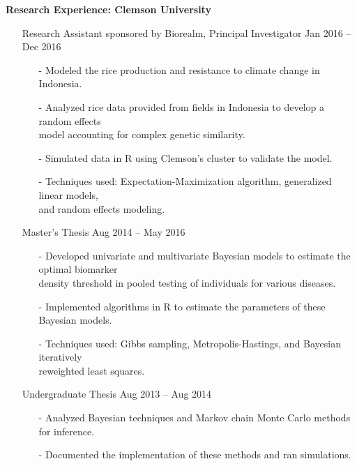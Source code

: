 \documentclass[10pt]{article}
\begin{document}
\noindent
\textbf{Research Experience: Clemson University}
\vspace{-0.25cm}
\begin{itemize}
\item[] Research Assistant sponsored by Biorealm, Principal Investigator \hfill Jan 2016 -- Dec 2016
\vspace{-0.25cm}
\begin{itemize}
\item[-] Modeled the rice production and resistance to climate change in Indonesia.
\vspace{-0.1cm}
\item[-] Analyzed rice data provided from fields in Indonesia to develop a random effects \\ model accounting for complex genetic similarity.
\vspace{-0.1cm}
\item[-] Simulated data in R using Clemson's cluster to validate the model.
\vspace{-0.1cm}
\item[-] Techniques used: Expectation-Maximization algorithm, generalized linear models, \\ and random effects modeling.
\vspace{-0.25cm}
\end{itemize}
\item[] Master's Thesis \hfill Aug 2014 -- May 2016
\vspace{-0.25cm}
\begin{itemize}
\item[-] Developed univariate and multivariate Bayesian models to estimate the optimal biomarker \\ density threshold in pooled testing of individuals for various diseases.
\vspace{-0.1cm}
\item[-] Implemented algorithms in R to estimate the parameters of these Bayesian models.
\vspace{-0.1cm}
\item[-] Techniques used: Gibbs sampling, Metropolis-Hastings, and Bayesian iteratively \\ reweighted least squares.
\vspace{-0.25cm}
\end{itemize}
\item[] Undergraduate Thesis \hfill Aug 2013 -- Aug 2014
\vspace{-0.25cm}
\begin{itemize}
\item[-] Analyzed Bayesian techniques and Markov chain Monte Carlo methods for inference.
\vspace{-0.1cm}
\item[-] Documented the implementation of these methods and ran simulations.
\end{itemize}
\end{itemize}
\end{document}

